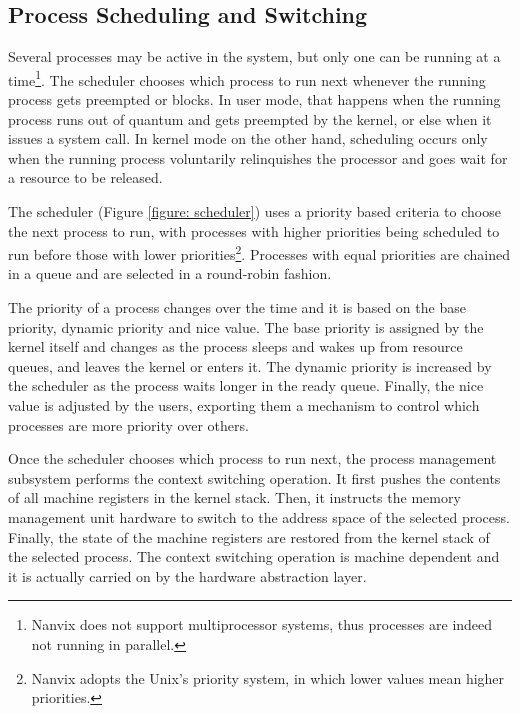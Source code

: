 \subsection{Process Scheduling and Switching}

	Several processes may be active in the system, but only one can
	be running at a time\footnote{Nanvix does not support
	multiprocessor systems, thus processes are indeed not running in
	parallel.}. The scheduler chooses which process to run next
	whenever the running process gets preempted or blocks. In user
	mode, that happens when the running process runs out of quantum
	and gets preempted by the kernel, or else when it issues a
	system call. In kernel mode on the other hand, scheduling occurs
	only when the running process voluntarily relinquishes the
	processor and goes wait for a resource to be released.

	The scheduler (Figure \ref{figure: scheduler}) uses a priority
	based criteria to choose the next process to run, with processes
	with higher priorities being scheduled to run before those with
	lower priorities\footnote{Nanvix adopts the Unix's priority
	system, in which lower values mean higher priorities.}.
	Processes with equal priorities are chained in a queue and are
	selected in a round-robin fashion.

	The priority of a process changes over the time and it is based on
	the base priority, dynamic priority and nice value. The base
	priority is assigned by the kernel itself and changes as the process
	sleeps and wakes up from resource queues, and leaves the kernel or
	enters it. The dynamic priority is increased by the scheduler as the
	process waits longer in the ready queue. Finally, the nice value is
	adjusted by the users, exporting them a mechanism to control which
	processes are more priority over others.

	Once the scheduler chooses which process to run next, the
	process management subsystem performs the context switching
	operation. It first pushes the contents of all machine registers
	in the kernel stack. Then, it instructs the memory management
	unit hardware to switch to the address space of the selected
	process. Finally, the state of the machine registers are
	restored from the kernel stack of the selected process. The
	context switching operation is machine dependent and it is
	actually carried on by the hardware abstraction layer.

